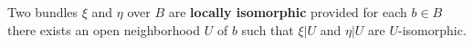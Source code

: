 Two bundles $\xi$ and $\eta$ over $B$ are \textbf{locally isomorphic} provided for each $b \in B$ there exists an open neighborhood $U$ of $b$ such that $\xi|U$ and $\eta|U$ are $U$-isomorphic.
